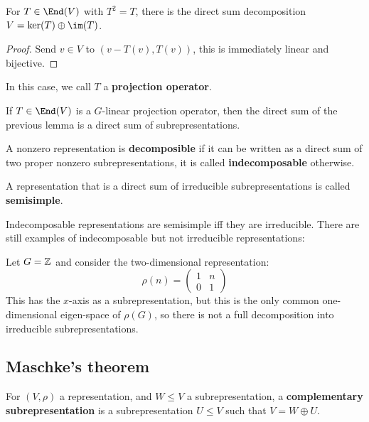 \documentclass{article}
\begin{document}
\begin{lemma}
    For $T\in\End(V)$ with $T^2=T$, there is the direct sum decomposition $V=\ker(T)\oplus\im(T)$.
    \begin{proof}
        Send $v\in V$ to $(v-T(v),T(v))$, this is immediately linear and bijective.
    \end{proof}
\end{lemma}

In this case, we call $T$ a \textbf{projection operator}.

\begin{corollary}
    If $T\in\End(V)$ is a $G$-linear projection operator, then the direct sum of the previous lemma is a direct sum of subrepresentations.
\end{corollary}

\begin{definition}
    A nonzero representation is \textbf{decomposible} if it can be written as a direct sum of  two proper nonzero subrepresentations, it is called \textbf{indecomposable} otherwise.

    A representation that is a direct sum of irreducible subrepresentations is called \textbf{semisimple}.
\end{definition}

Indecomposable representations are semisimple iff they are irreducible. There are still examples of indecomposable but not irreducible representations:

Let $G=\mathbb{Z}$ and consider the two-dimensional representation: \[
\rho(n) = \begin{pmatrix}
    1 & n \\ 0 & 1
\end{pmatrix}
\] This has the $x$-axis as a subrepresentation, but this is the only common one-dimensional eigen-space of $\rho(G)$, so there is not a full decomposition into irreducible subrepresentations.

\subsection{Maschke's theorem}

\begin{definition}
    For $(V,\rho)$ a representation, and $W\leq V$ a subrepresentation, a \textbf{complementary subrepresentation} is a subrepresentation $U\leq V$ such that $V=W\oplus U$.
\end{definition}
\end{document}
